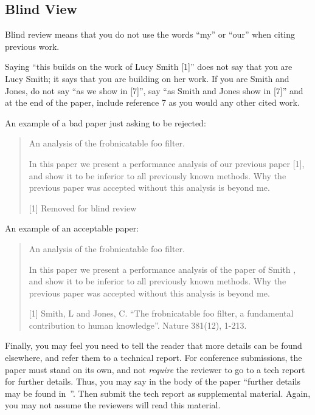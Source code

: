 \documentclass[10pt,twocolumn,letterpaper]{article}
\begin{document}
\subsection{Blind View}
Blind review means that you do not use the words ``my'' or ``our'' when citing previous work.

Saying ``this builds on the work of Lucy Smith [1]'' does not say that you are Lucy Smith;
it says that you are building on her work.
If you are Smith and Jones, do not say ``as we show in [7]'', say ``as Smith and Jones show in [7]'' and at the end of the paper, include reference 7 as you would any other cited work.

An example of a bad paper just asking to be rejected:
\begin{quote}
\begin{center}
    An analysis of the frobnicatable foo filter.
\end{center}

   In this paper we present a performance analysis of our previous paper [1], and show it to be inferior to all previously known methods.
   Why the previous paper was accepted without this analysis is beyond me.

   [1] Removed for blind review
\end{quote}


An example of an acceptable paper:
\begin{quote}
\begin{center}
     An analysis of the frobnicatable foo filter.
\end{center}

   In this paper we present a performance analysis of the  paper of Smith \etal [1], and show it to be inferior to all previously known methods.
   Why the previous paper was accepted without this analysis is beyond me.

   [1] Smith, L and Jones, C. ``The frobnicatable foo filter, a fundamental contribution to human knowledge''. Nature 381(12), 1-213.
\end{quote}

Finally, you may feel you need to tell the reader that more details can be found elsewhere, and refer them to a technical report.
For conference submissions, the paper must stand on its own, and not {\em require} the reviewer to go to a tech report for further details.
Thus, you may say in the body of the paper ``further details may be found in~\cite{Authors14b}''.
Then submit the tech report as supplemental material.
Again, you may not assume the reviewers will read this material.
\end{document}

